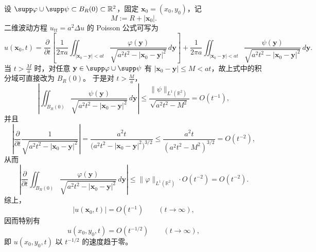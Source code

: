 \begin{solution}
设 $\supp\varphi\cup\supp\psi\subset B_R(0)\subset\mathbb R^2$，固定 $\mathbf x_0=(x_0,y_0)$，记
\[
M:=R+|\mathbf x_0|.
\]
二维波动方程 $u_{tt}=a^2\Delta u$ 的 Poisson 公式可写为
\[
u(\mathbf x_0,t)=\frac{\partial}{\partial t}\left[\frac1{2\pi a}
\iint_{|\mathbf x_0-\mathbf y|<at}\frac{\varphi(\mathbf y)}{\sqrt{a^2t^2-|\mathbf x_0-\mathbf y|^2}}\,d\mathbf y\right]
+\frac1{2\pi a}\iint_{|\mathbf x_0-\mathbf y|<at}\frac{\psi(\mathbf y)}{\sqrt{a^2t^2-|\mathbf x_0-\mathbf y|^2}}\,d\mathbf y .
\]
当 $t>\frac{M}{a}$ 时，对任意 $\mathbf y\in\supp\varphi\cup\supp\psi$ 有
$|\mathbf x_0-\mathbf y|\le M<at$，故上式中的积分域可直接改为 $B_R(0)$。
于是对 $t>\frac{M}{a}$，
\[
\left|\iint_{B_R(0)}\frac{\psi(\mathbf y)}{\sqrt{a^2t^2-|\mathbf x_0-\mathbf y|^2}}\,d\mathbf y\right|
\le
\frac{\|\psi\|_{L^1(\mathbb R^2)}}{\sqrt{a^2t^2-M^2}}
=O(t^{-1}),
\]
并且
\[
\left|\frac{\partial}{\partial t}\frac{1}{\sqrt{a^2t^2-|\mathbf x_0-\mathbf y|^2}}\right|
=\frac{a^2t}{\bigl(a^2t^2-|\mathbf x_0-\mathbf y|^2\bigr)^{3/2}}
\le \frac{a^2t}{(a^2t^2-M^2)^{3/2}}=O(t^{-2}),
\]
从而
\[
\left|\frac{\partial}{\partial t}\iint_{B_R(0)}
\frac{\varphi(\mathbf y)}{\sqrt{a^2t^2-|\mathbf x_0-\mathbf y|^2}}\,d\mathbf y\right|
\le
\|\varphi\|_{L^1(\mathbb R^2)}\cdot O(t^{-2})=O(t^{-2}).
\]
综上，
\[
|u(\mathbf x_0,t)|=O(t^{-1})\qquad (t\to\infty),
\]
因而特别有
\[
u(x_0,y_0,t)=O(t^{-1/2})\qquad (t\to\infty),
\]
即 $u(x_0,y_0,t)$ 以 $t^{-1/2}$ 的速度趋于零。
\end{solution}
